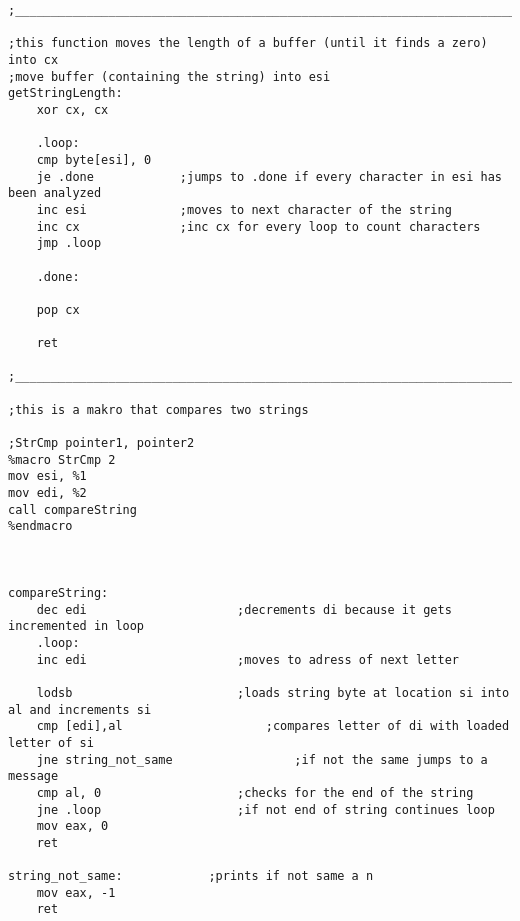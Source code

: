 \begin{lstlisting}[language={[x86masm]Assembler}]
;___________________________________________________________________________________________________________________________________________

;this function moves the length of a buffer (until it finds a zero) into cx
;move buffer (containing the string) into esi
getStringLength:
	xor cx, cx

	.loop:
	cmp byte[esi], 0	
	je .done			;jumps to .done if every character in esi has been analyzed
	inc esi				;moves to next character of the string
	inc cx				;inc cx for every loop to count characters
	jmp .loop
	
	.done:

	pop cx

	ret

;___________________________________________________________________________________________________________________________________________

;this is a makro that compares two strings

;StrCmp pointer1, pointer2
%macro StrCmp 2
mov esi, %1
mov edi, %2
call compareString
%endmacro



compareString:
	dec edi						;decrements di because it gets incremented in loop
	.loop:
	inc edi						;moves to adress of next letter
	
	lodsb 						;loads string byte at location si into al and increments si
	cmp [edi],al 					;compares letter of di with loaded letter of si
	jne string_not_same 				;if not the same jumps to a message
	cmp al, 0 					;checks for the end of the string
	jne .loop 					;if not end of string continues loop
	mov eax, 0
	ret

string_not_same: 			;prints if not same a n
	mov eax, -1
	ret

\end{lstlisting}
